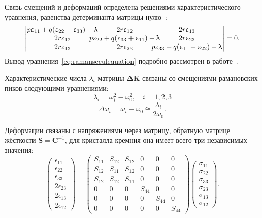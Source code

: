 Связь смещений и деформаций определена решениями характеристического уравнения,
равенства детерминанта матрицы нулю~\cite{DeWolf1996}:
\begin{equation}\label{eq:ramanseculequation}
    \setlength{\arraycolsep}{-6pt}%
    \begin{vmatrix}
    p \epsilon_{11} + q (\epsilon_{22} + \epsilon_{33}) - \lambda & 2r \epsilon_{12} & 2r \epsilon_{13} \\
    2r \epsilon_{12} & p \epsilon_{22} + q (\epsilon_{33} + \epsilon_{11}) - \lambda & 2r \epsilon_{23} \\
    2r \epsilon_{13} & 2r \epsilon_{23} & p \epsilon_{33} + q (\epsilon_{11} + \epsilon_{22}) - \lambda
    \end{vmatrix}
    =
    0.
\end{equation}
Вывод уравнения~\eqref{eq:ramanseculequation} подробно рассмотрен в работе~\cite{DeWolf2015relation}.

Характеристические числа \(\lambda_i\) матрицы  \(\mathbf{\Delta K}\) связаны со
смещениями рамановских пиков следующими уравнениями:
\begin{equation}
\lambda_i = \omega_i^2 - \omega_0^2,\quad i = 1, 2, 3
\end{equation}
\begin{equation}\label{eq:ramandeltaomega}
\Delta\omega_i = \omega_i - \omega_0 \cong \frac{\lambda_i}{2\omega_0}.
\end{equation}

Деформации связаны с напряжениями через матрицу, обратную матрице жёсткости
\(\mathbf{S} = \mathbf{C}^{-1}\), для кристалла кремния она имеет всего три
независимых значения:
\begin{equation}\label{eq:def_stress_relation}
    \begin{pmatrix}
    \epsilon_{11}\\
    \epsilon_{22}\\
    \epsilon_{33}\\
    2\epsilon_{23}\\
    2\epsilon_{13}\\
    2\epsilon_{12}
    \end{pmatrix}
    =
    \begin{pmatrix}
    S_{11} & S_{12} & S_{12} & 0 & 0 & 0 \\
    S_{12} & S_{11} & S_{12} & 0 & 0 & 0 \\
    S_{12} & S_{12} & S_{11} & 0 & 0 & 0 \\
    0 & 0 & 0 & S_{44} & 0 & 0 \\
    0 & 0 & 0 & 0 & S_{44} & 0 \\
    0 & 0 & 0 & 0 & 0 & S_{44}
    \end{pmatrix}
    \begin{pmatrix}
    \sigma_{11}\\
    \sigma_{22}\\
    \sigma_{33}\\
    \sigma_{23}\\
    \sigma_{13}\\
    \sigma_{12}
    \end{pmatrix}\!\!.
\end{equation}

